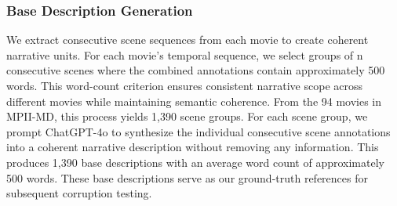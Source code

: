 \documentclass[main.tex]{subfiles}
\begin{document}
\subsubsection{Base Description Generation}
We extract consecutive scene sequences from each movie to create coherent narrative units. For each movie's temporal sequence, we select groups of n consecutive scenes where the combined annotations contain approximately 500 words. This word-count criterion ensures consistent narrative scope across different movies while maintaining semantic coherence. From the 94 movies in MPII-MD, this process yields 1,390 scene groups. For each scene group, we prompt ChatGPT-4o to synthesize the individual consecutive scene annotations into a coherent narrative description without removing any information. This produces 1,390 base descriptions with an average word count of approximately 500 words. These base descriptions serve as our ground-truth references for subsequent corruption testing.
\end{document}
